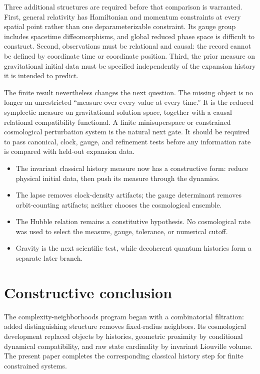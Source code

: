 \documentclass[10pt]{article}
\newenvironment{persuasions}
  {\begin{cpbox}\small\setlength{\parskip}{0pt}%
   {\footnotesize\bfseries\color{accent}%
    \textls[110]{CONCEPTUAL PERSUASIONS}}\par\vspace{3pt}%
   \begin{itemize}[leftmargin=1.15em,itemsep=2.5pt,topsep=0pt,parsep=0pt,
                   label=\textcolor{accent}{\scriptsize$\blacktriangleright$}]}
  {\end{itemize}\end{cpbox}}
\begin{document}
Three additional structures are required before that comparison is warranted.
First, general relativity has Hamiltonian and momentum constraints at every
spatial point rather than one deparameterizable constraint.  Its gauge group
includes spacetime diffeomorphisms, and global reduced phase space is difficult
to construct.  Second, observations must be relational and causal: the record
cannot be defined by coordinate time or coordinate position.  Third, the prior
measure on gravitational initial data must be specified independently of the
expansion history it is intended to predict.

The finite result nevertheless changes the next question.  The missing object
is no longer an unrestricted ``measure over every value at every time.''  It
is the reduced symplectic measure on gravitational solution space, together
with a causal relational compatibility functional.  A finite minisuperspace
or constrained cosmological perturbation system is the natural next gate.  It
should be required to pass canonical, clock, gauge, and refinement tests before
any information rate is compared with held-out expansion data.

\begin{persuasions}
\item The invariant classical history measure now has a constructive form:
reduce physical initial data, then push its measure through the dynamics.
\item The lapse removes clock-density artifacts; the gauge determinant removes
orbit-counting artifacts; neither chooses the cosmological ensemble.
\item The Hubble relation remains a constitutive hypothesis.  No cosmological
rate was used to select the measure, gauge, tolerance, or numerical cutoff.
\item Gravity is the next scientific test, while decoherent quantum histories
form a separate later branch.
\end{persuasions}

\section*{Constructive conclusion}
\enlargethispage{2\baselineskip}

The complexity-neighborhoods program began with a combinatorial filtration:
added distinguishing structure removes fixed-radius neighbors.  Its
cosmological development replaced objects by histories, geometric proximity by
conditional dynamical compatibility, and raw state cardinality by invariant
Liouville volume.  The present paper completes the corresponding classical
history step for finite constrained systems.
\end{document}
